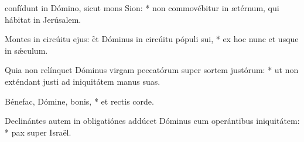 \begin{psalmus}

 confídunt in Dómino, sicut mons Sion: * non commovébitur in ætérnum, qui hábitat in Jerúsalem.

Montes in circúitu ejus: \f et Dóminus in circúitu pópuli sui, * ex hoc nunc et usque in sǽculum.

Quia non relínquet Dóminus virgam peccatórum super sortem justórum: * ut non exténdant justi ad iniquitátem manus suas.

Bénefac, Dómine, bonis, * et rectis corde.

Declinántes autem in obligatiónes addúcet Dóminus cum operántibus iniquitátem: * pax super Israël.

\end{psalmus}
